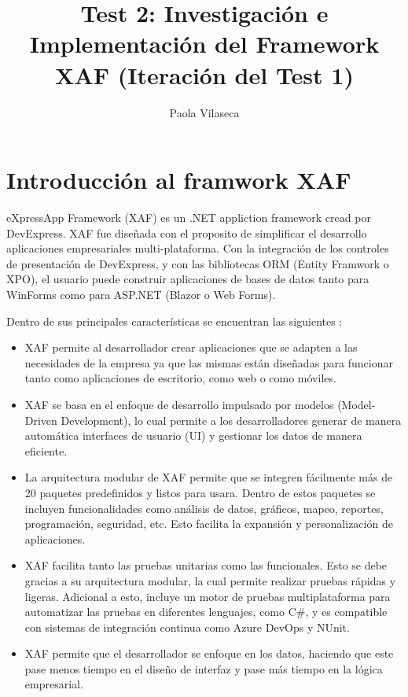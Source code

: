 \documentclass{article}
\title{Test 2: Investigación e Implementación del Framework XAF (Iteración del Test 1)}
\author{Paola Vilaseca}
\begin{document}
\maketitle

\section{Introducción al framwork XAF}
eXpressApp Framework (XAF) es un .NET appliction framework cread por DevExpress. XAF fue diseñada con el proposito de simplificar el desarrollo aplicaciones empresariales multi-plataforma. Con la integración de los controles de presentación de DevExpress, y con las bibliotecas ORM (Entity Framwork o XPO), el usuario puede construir aplicaciones de bases de datos tanto para WinForms como para ASP.NET (Blazor o Web Forms). 

Dentro de sus principales características se encuentran las siguientes \cite{componentsource2023}:

\begin{itemize}
    \item XAF permite al desarrollador crear aplicaciones que se adapten a las necesidades de la empresa ya que las mismas están diseñadas para funcionar tanto como aplicaciones de escritorio, como web o como móviles. 
    \item XAF se basa en el enfoque de desarrollo impulsado por modelos (Model-Driven Development), lo cual permite a los desarrolladores generar de manera automática interfaces de usuario (UI) y gestionar los datos de manera eficiente.  
    \item La arquitectura modular de XAF permite que se integren fácilmente más de 20 paquetes predefinidos y listos para usara. Dentro de estos paquetes se incluyen funcionalidades como análisis de datos, gráficos, mapeo, reportes, programación, seguridad, etc. Esto facilita la expansión y personalización de aplicaciones. 
    \item XAF facilita tanto las pruebas unitarias como las funcionales. Esto se debe gracias a su arquitectura modular, la cual permite realizar pruebas rápidas y ligeras. Adicional a esto, incluye un motor de pruebas multiplataforma para automatizar las pruebas en diferentes lenguajes, como C\#, y es compatible con sistemas de integración continua como Azure DevOps y NUnit.
    \item XAF permite que el desarrollador se enfoque en los datos, haciendo que este pase menos tiempo en el diseño de interfaz y pase más tiempo en la lógica empresarial. 
\end{itemize} 
\end{document}
